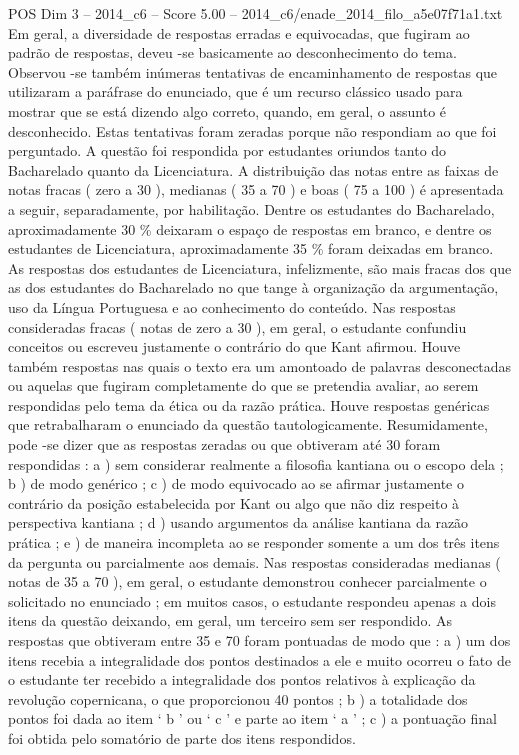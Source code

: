 \begin{textsample}{POS Dim 3 – 2014\_c6 – Score 5.00 – 2014\_c6/enade\_2014\_filo\_a5e07f71a1.txt}
Em geral, a diversidade de respostas erradas e equivocadas, que fugiram ao padrão de respostas, deveu -se basicamente ao desconhecimento do tema.
Observou -se também inúmeras tentativas de encaminhamento de respostas que utilizaram a paráfrase do enunciado, que é um recurso clássico usado para mostrar que se está dizendo algo correto, quando, em geral, o assunto é desconhecido.
Estas tentativas foram zeradas porque não respondiam ao que foi perguntado.
A questão foi respondida por estudantes oriundos tanto do Bacharelado quanto da Licenciatura.
A distribuição das notas entre as faixas de notas fracas ( zero a 30 ), medianas ( 35 a 70 ) e boas ( 75 a 100 ) é apresentada a seguir, separadamente, por habilitação.
Dentre os estudantes do Bacharelado, aproximadamente 30 \% deixaram o espaço de respostas em branco, e dentre os estudantes de Licenciatura, aproximadamente 35 \% foram deixadas em branco.
As respostas dos estudantes de Licenciatura, infelizmente, são mais fracas dos que as dos estudantes do Bacharelado no que tange à organização da argumentação, uso da Língua Portuguesa e ao conhecimento do conteúdo.
Nas respostas consideradas fracas ( notas de zero a 30 ), em geral, o estudante confundiu conceitos ou escreveu justamente o contrário do que Kant afirmou.
Houve também respostas nas quais o texto era um amontoado de palavras desconectadas ou aquelas que fugiram completamente do que se pretendia avaliar, ao serem respondidas pelo tema da ética ou da razão prática.
Houve respostas genéricas que retrabalharam o enunciado da questão tautologicamente.
Resumidamente, pode -se dizer que as respostas zeradas ou que obtiveram até 30 foram respondidas : a ) sem considerar realmente a filosofia kantiana ou o escopo dela ; b ) de modo genérico ; c ) de modo equivocado ao se afirmar justamente o contrário da posição estabelecida por Kant ou algo que não diz respeito à perspectiva kantiana ; d ) usando argumentos da análise kantiana da razão prática ; e ) de maneira incompleta ao se responder somente a um dos três itens da pergunta ou parcialmente aos demais.
Nas respostas consideradas medianas ( notas de 35 a 70 ), em geral, o estudante demonstrou conhecer parcialmente o solicitado no enunciado ; em muitos casos, o estudante respondeu apenas a dois itens da questão deixando, em geral, um terceiro sem ser respondido.
As respostas que obtiveram entre 35 e 70 foram pontuadas de modo que : a ) um dos itens recebia a integralidade dos pontos destinados a ele e muito ocorreu o fato de o estudante ter recebido a integralidade dos pontos relativos à explicação da revolução copernicana, o que proporcionou 40 pontos ; b ) a totalidade dos pontos foi dada ao item ‘ b ’ ou ‘ c ’ e parte ao item ‘ a ’ ; c ) a pontuação final foi obtida pelo somatório de parte dos itens respondidos.

\end{textsample}
